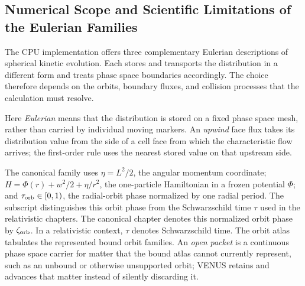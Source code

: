 \subsection{Numerical Scope and Scientific Limitations of the Eulerian Families}
\label{sec:eulerian-family-scope}

The CPU implementation offers three complementary Eulerian descriptions of
spherical kinetic evolution.  Each stores and transports the distribution in
a different form and treats phase space boundaries accordingly.  The choice
therefore depends on the orbits, boundary fluxes, and collision processes that
the calculation must resolve.

Here \emph{Eulerian} means that the distribution is stored on a fixed
phase space mesh, rather than carried by individual moving markers.  An
\emph{upwind} face flux takes its distribution value from the side of a cell
face from which the characteristic flow arrives; the first-order rule uses
the nearest stored value on that upstream side.

The canonical family uses \(\eta=L^2/2\), the angular momentum coordinate;
\(H=\Phi(r)+w^2/2+\eta/r^2\), the one-particle Hamiltonian in a frozen
potential \(\Phi\); and \(\tau_{\rm orb}\in[0,1)\), the radial-orbit phase
normalized by one radial period.  The subscript distinguishes this orbit
phase from the Schwarzschild time \(\tau\) used in the relativistic chapters.
The canonical chapter denotes this normalized orbit phase by
\(\zeta_{\rm orb}\).  In a relativistic context, \(\tau\) denotes
Schwarzschild time.  The orbit atlas tabulates the represented bound orbit families.
An \emph{open packet} is a continuous phase space carrier for matter that the
bound atlas cannot currently represent, such as an unbound or otherwise
unsupported orbit; VENUS retains and advances that matter instead of silently
discarding it.

